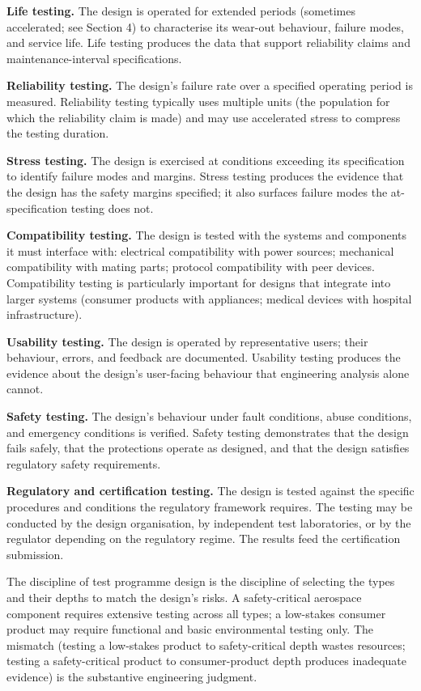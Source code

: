 \textbf{Life testing.} The design is operated for extended periods (sometimes accelerated; see Section 4) to characterise its wear-out behaviour, failure modes, and service life. Life testing produces the data that support reliability claims and maintenance-interval specifications.

\textbf{Reliability testing.} The design's failure rate over a specified operating period is measured. Reliability testing typically uses multiple units (the population for which the reliability claim is made) and may use accelerated stress to compress the testing duration.

\textbf{Stress testing.} The design is exercised at conditions exceeding its specification to identify failure modes and margins. Stress testing produces the evidence that the design has the safety margins specified; it also surfaces failure modes the at-specification testing does not.

\textbf{Compatibility testing.} The design is tested with the systems and components it must interface with: electrical compatibility with power sources; mechanical compatibility with mating parts; protocol compatibility with peer devices. Compatibility testing is particularly important for designs that integrate into larger systems (consumer products with appliances; medical devices with hospital infrastructure).

\textbf{Usability testing.} The design is operated by representative users; their behaviour, errors, and feedback are documented. Usability testing produces the evidence about the design's user-facing behaviour that engineering analysis alone cannot.

\textbf{Safety testing.} The design's behaviour under fault conditions, abuse conditions, and emergency conditions is verified. Safety testing demonstrates that the design fails safely, that the protections operate as designed, and that the design satisfies regulatory safety requirements.

\textbf{Regulatory and certification testing.} The design is tested against the specific procedures and conditions the regulatory framework requires. The testing may be conducted by the design organisation, by independent test laboratories, or by the regulator depending on the regulatory regime. The results feed the certification submission.

The discipline of test programme design is the discipline of selecting the types and their depths to match the design's risks. A safety-critical aerospace component requires extensive testing across all types; a low-stakes consumer product may require functional and basic environmental testing only. The mismatch (testing a low-stakes product to safety-critical depth wastes resources; testing a safety-critical product to consumer-product depth produces inadequate evidence) is the substantive engineering judgment.

